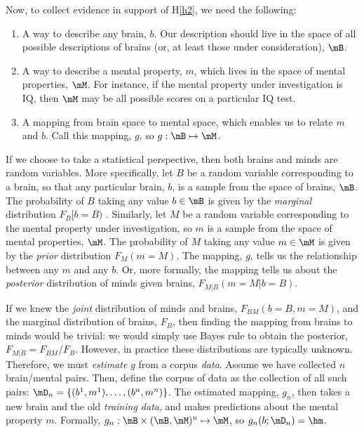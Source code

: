 Now, to collect evidence in support of H\ref{h2}, we need the following:
\begin{enumerate}
	\item A way to describe any brain, $b$. Our description should live in the space of all possible descriptions of brains (or, at least those under consideration), $\mB$. 
	\item A way to describe a mental property, $m$, which lives in the space of mental properties, $\mM$. For instance, if the mental property under investigation is IQ, then $\mM$ may be all possible scores on a particular IQ test. 
	\item A mapping from brain space to mental space, which enables us to relate $m$ and $b$. Call this mapping, $g$, so $g: \mB \mapsto \mM$. 
\end{enumerate}

If we choose to take a statistical perspective, then both brains and minds are random variables. More specifically, let $B$ be a random variable corresponding to a brain, so that any particular brain, $b$, is a sample from the space of brains, $\mB$. The probability of $B$ taking any value $b \in \mB$ is given by the \emph{marginal} distribution $F_B[b = B)$%
. Similarly, let $M$ be a random variable corresponding to the mental property under investigation, so $m$ is a sample from the space of mental properties, $\mM$. The probability of $M$ taking any value $m \in \mM$ is given by the \emph{prior} distribution $F_M(m = M)$. The mapping, $g$, tells us the relationship between any $m$ and any $b$. Or, more formally, the mapping tells us about the \emph{posterior} distribution of minds given brains, $F_{M|B}(m=M | b=B)$. 

If we knew the \emph{joint} distribution of minds and brains, $F_{BM}(b=B,m=M)$, and the marginal distribution of brains, $F_B$, then finding the mapping from brains to minds would be trivial: we would simply use Bayes rule to obtain the posterior, $F_{M|B} = F_{BM}/F_B$. However, in practice these distributions are typically unknown. Therefore, we must \emph{estimate} $g$ from a corpus \emph{data}. Assume we have collected $n$ brain/mental pairs. Then, define the corpus of data as the collection of all such pairs: $\mD_n=\{(b^1,m^1), \ldots, (b^n,m^n)\}$. The estimated mapping, $g_n$, then takes a new brain and the old \emph{training data}, and makes predictions about the mental property $m$. Formally, $g_n: \mB \times (\mB, \mM)^n \mapsto \mM$, so $g_n(b; \mD_n)=\hm$.

